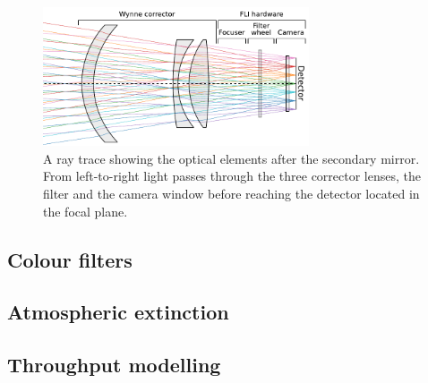\begin{colsection}
\begin{colsection}
\begin{figure}[p]
    \begin{center}
        \includegraphics[width=0.7\textwidth]{images/throughput/wynne.pdf}
    \end{center}
    \caption[Ray tracing the corrector elements]{
        A ray trace showing the optical elements after the secondary mirror. From left-to-right light passes through the three corrector lenses, the filter and the camera window before reaching the detector located in the focal plane.
    }\label{fig:wynne}
\end{figure}

\clearpage

\end{colsection}

\newpage
\subsection{Colour filters}
\label{sec:filters}
\begin{colsection}


\end{colsection}

\newpage
\subsection{Atmospheric extinction}
\label{sec:atmosphere}
\begin{colsection}


\end{colsection}

\newpage
\subsection{Throughput modelling}
\label{sec:synphot}
\begin{colsection}


\end{colsection}
\end{colsection}

